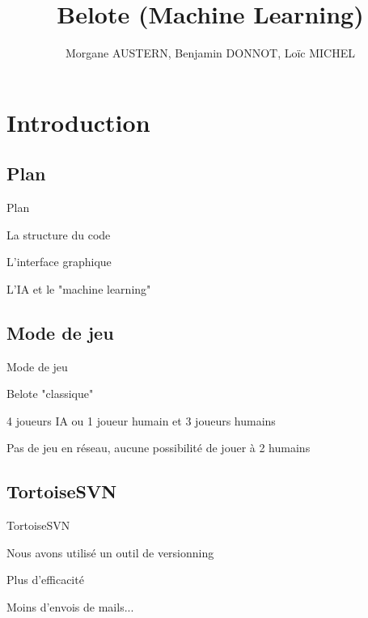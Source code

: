 \documentclass[c,12pt]{beamer}
\title[]{Belote (Machine Learning)}
\author[]{Morgane AUSTERN, Benjamin DONNOT, Loïc MICHEL}
\institute{ENSAE}
\begin{document}
\frame[plain]%
{\titlepage}%
\section{Introduction}
	\subsection{Plan}
\begin{frame}{Plan}
 \begin{itemize}
     {\item La structure du code}
    	\newline
     {\item L'interface graphique}
    	\newline
     {\item L'IA et le "machine learning"}
  \end{itemize}
\end{frame}

	\subsection{Mode de jeu}
\begin{frame}{Mode de jeu}
 \begin{itemize}
     {\item Belote "classique"}
    	\newline
    	
     {\item 4 joueurs IA ou 1 joueur humain et 3 joueurs humains}
    	\newline
    	
     {\item Pas de jeu en réseau, aucune possibilité de jouer à 2 humains}
    	\newline    	
  \end{itemize}
\end{frame}
	\subsection{TortoiseSVN}
\begin{frame}{TortoiseSVN}
 \begin{itemize}
     {\item Nous avons utilisé un outil de versionning}
    	\newline
    	
     {\item Plus d'efficacité}
    	\newline
    	
     {\item Moins d'envois de mails...}
    	\newline    	
  \end{itemize}
\end{frame}
\end{document}
